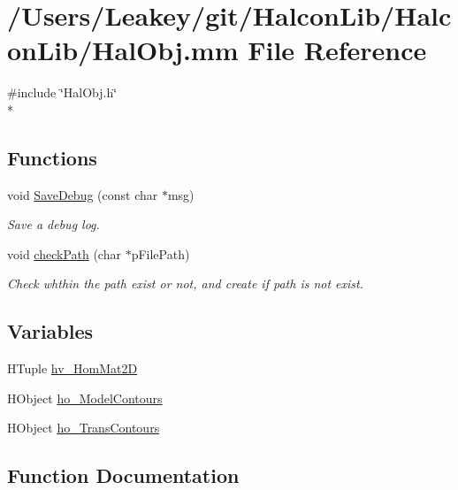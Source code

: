 \hypertarget{_hal_obj_8mm}{}\section{/\+Users/\+Leakey/git/\+Halcon\+Lib/\+Halcon\+Lib/\+Hal\+Obj.mm File Reference}
\label{_hal_obj_8mm}
{\ttfamily \#include \char`\"{}Hal\+Obj.\+h\char`\"{}}\\*
\subsection*{Functions}
\begin{DoxyCompactItemize}
\item 
void \hyperlink{_hal_obj_8mm_a85c8849cac3c2a1a71d3e06f79512134}{Save\+Debug} (const char $\ast$msg)
\begin{DoxyCompactList}\small\item\em Save a debug log. \end{DoxyCompactList}\item 
void \hyperlink{_hal_obj_8mm_acc60c39df87642dd02ddc919e50fbeaa}{check\+Path} (char $\ast$p\+File\+Path)
\begin{DoxyCompactList}\small\item\em Check whthin the path exist or not, and create if path is not exist. \end{DoxyCompactList}\end{DoxyCompactItemize}
\subsection*{Variables}
\begin{DoxyCompactItemize}
\item 
H\+Tuple \hyperlink{_hal_obj_8mm_a0d254380a6b952b708031f003cc21f9b}{hv\+\_\+\+Hom\+Mat2D}
\item 
H\+Object \hyperlink{_hal_obj_8mm_aed0453cf93e45f5dd8460027e7cfb00d}{ho\+\_\+\+Model\+Contours}
\item 
H\+Object \hyperlink{_hal_obj_8mm_aaf1bcad70223e21a60f6b90a05ec3e13}{ho\+\_\+\+Trans\+Contours}
\end{DoxyCompactItemize}


\subsection{Function Documentation}
